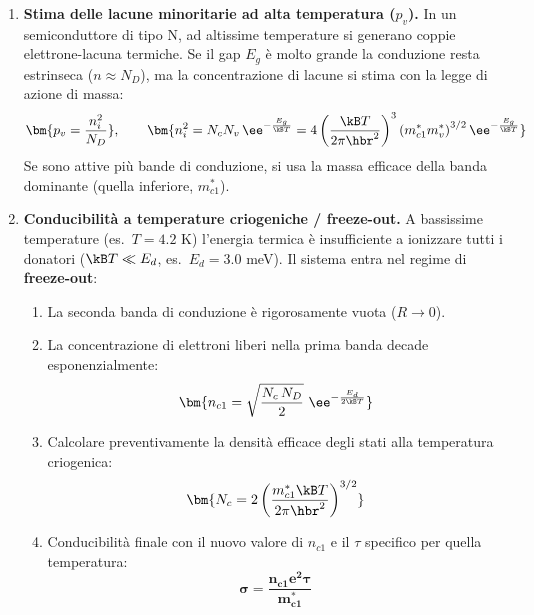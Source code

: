 \begin{enumerate}
\item \textbf{Stima delle lacune minoritarie ad alta temperatura ($p_v$).}
In un semiconduttore di tipo N, ad altissime temperature si generano coppie elettrone-lacuna termiche. Se il gap $E_g$ è molto grande la conduzione resta estrinseca ($n\approx N_D$), ma la concentrazione di lacune si stima con la legge di azione di massa:
\[ \bm{p_v = \frac{n_i^2}{N_D}}, \qquad
   \bm{n_i^2 = N_cN_v\,\ee^{-\frac{E_g}{\kB T}} = 4\left(\frac{\kB T}{2\pi\hbr^2}\right)^{3}\left(m_{c1}^*m_v^*\right)^{3/2}\ee^{-\frac{E_g}{\kB T}}} \]
Se sono attive più bande di conduzione, si usa la massa efficace della banda dominante (quella inferiore, $m_{c1}^*$).

\item \textbf{Conducibilità a temperature criogeniche / freeze-out.}
A bassissime temperature (es.\ $T=4.2$ K) l'energia termica è insufficiente a ionizzare tutti i donatori ($\kB T\ll E_d$, es.\ $E_d=3.0$ meV). Il sistema entra nel regime di \textbf{freeze-out}:
\begin{enumerate}
    \item La seconda banda di conduzione è rigorosamente vuota ($R\to0$).
    \item La concentrazione di elettroni liberi nella prima banda decade esponenzialmente:
    \[ \bm{n_{c1}=\sqrt{\frac{N_c\,N_D}{2}}\ \ee^{-\frac{E_d}{2\kB T}}} \]
    \item Calcolare preventivamente la densità efficace degli stati alla temperatura criogenica:
    \[ \bm{N_c = 2\left(\frac{m_{c1}^*\kB T}{2\pi\hbr^2}\right)^{3/2}} \]
    \item Conducibilità finale con il nuovo valore di $n_{c1}$ e il $\tau$ specifico per quella temperatura:
    \[ \bm{\sigma = \frac{n_{c1}e^2\tau}{m_{c1}^*}} \]
\end{enumerate}
\end{enumerate}


\vspace{0.5cm}
